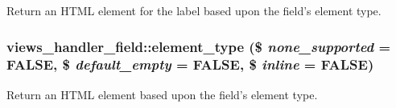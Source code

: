 \label{classviews__handler__field_ac0ba0ea52c53f0695bfba23bd6fa627f}
Return an HTML element for the label based upon the field's element type. \hypertarget{classviews__handler__field_a80ea5743144a8608145eb22d23a23d90}{
\subsubsection[{element\_\-type}]{\setlength{\rightskip}{0pt plus 5cm}views\_\-handler\_\-field::element\_\-type (\$ {\em none\_\-supported} = {\ttfamily FALSE}, \/  \$ {\em default\_\-empty} = {\ttfamily FALSE}, \/  \$ {\em inline} = {\ttfamily FALSE})}}
\label{classviews__handler__field_a80ea5743144a8608145eb22d23a23d90}
Return an HTML element based upon the field's element type. 

